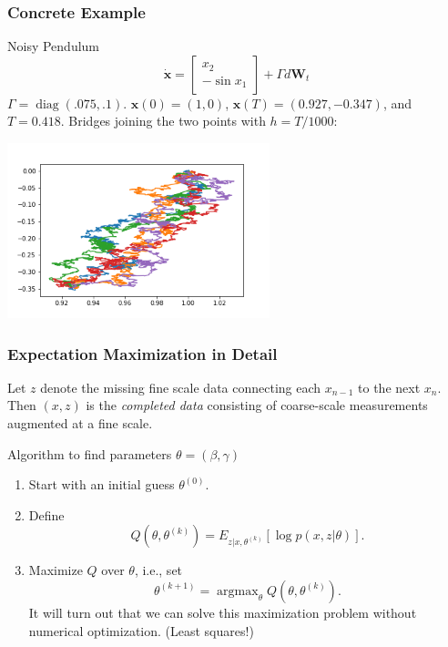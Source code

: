 \documentclass{beamer}
\begin{document}
\begin{frame}
\frametitle{Concrete Example}
\begin{block}{Noisy Pendulum}
$$
\dot{\mathbf{x}} = \begin{bmatrix} x_2 \\ -\sin x_1 \end{bmatrix} + \Gamma d \mathbf{W}_t
$$
$\Gamma = \operatorname{diag}(.075, .1)$.
$\mathbf{x}(0) = (1,0)$, $\mathbf{x}(T) = (0.927, -0.347)$, and $T = 0.418$. 
Bridges joining the two points with $h = T/1000$:
\begin{center}
\includegraphics[width=3in]{bridge2d.png}
\end{center}
\end{block}
\end{frame}

\begin{frame}
\frametitle{Expectation Maximization in Detail}
Let $z$ denote the missing fine scale data connecting each $x_{n-1}$ to the next $x_n$.  Then $(x,z)$ is the \emph{completed data} consisting of coarse-scale measurements augmented at a fine scale.
\begin{block}{Algorithm to find parameters $\theta = (\beta,\gamma)$}
\begin{enumerate}
\item Start with an initial guess $\theta^{(0)}$.
\item Define
$$
Q(\theta, \theta^{(k)}) = E_{z | x, \theta^{(k)}} [ \log p(x, z | \theta) ].
$$
\item Maximize $Q$ over $\theta$, i.e., set
$$
\theta^{(k+1)} = \operatorname{argmax}_\theta Q(\theta,\theta^{(k)}).
$$
It will turn out that we can solve this maximization problem without numerical optimization.  (Least squares!)
\end{enumerate}
\end{block}
\end{frame}
\end{document}
